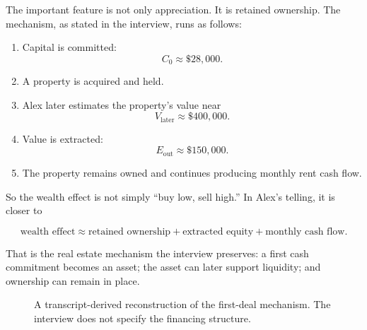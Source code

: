 The important feature is not only appreciation. It is retained ownership. The mechanism, as stated in the interview, runs as follows:

\begin{enumerate}
\item Capital is committed:
\[
C_0 \approx \$28{,}000.
\]

\item A property is acquired and held.

\item Alex later estimates the property's value near
\[
V_{\text{later}} \approx \$400{,}000.
\]

\item Value is extracted:
\[
E_{\text{out}} \approx \$150{,}000.
\]

\item The property remains owned and continues producing monthly rent cash flow.
\end{enumerate}

So the wealth effect is not simply ``buy low, sell high.'' In Alex's telling, it is closer to

\begin{equation}
\text{wealth effect}
\approx
\text{retained ownership}
+
\text{extracted equity}
+
\text{monthly cash flow}.
\end{equation}

That is the real estate mechanism the interview preserves: a first cash commitment becomes an asset; the asset can later support liquidity; and ownership can remain in place.

\begin{figure}
\centering
{}
\caption{A transcript-derived reconstruction of the first-deal mechanism. The interview does not specify the financing structure.}
\end{figure}

